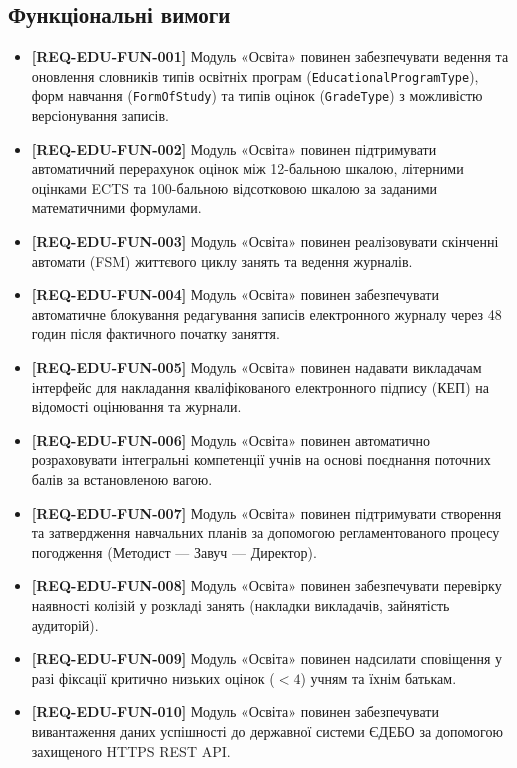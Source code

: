 \documentclass{article}
\begin{document}
\subsection{Функціональні вимоги}
\begin{itemize}
    \item \textbf{[REQ-EDU-FUN-001]} Модуль «Освіта» повинен забезпечувати ведення та оновлення словників типів освітніх програм (\texttt{EducationalProgramType}), форм навчання (\texttt{FormOfStudy}) та типів оцінок (\texttt{GradeType}) з можливістю версіонування записів.
    \item \textbf{[REQ-EDU-FUN-002]} Модуль «Освіта» повинен підтримувати автоматичний перерахунок оцінок між 12-бальною шкалою, літерними оцінками ECTS та 100-бальною відсотковою шкалою за заданими математичними формулами.
    \item \textbf{[REQ-EDU-FUN-003]} Модуль «Освіта» повинен реалізовувати скінченні автомати (FSM) життєвого циклу занять та ведення журналів.
    \item \textbf{[REQ-EDU-FUN-004]} Модуль «Освіта» повинен забезпечувати автоматичне блокування редагування записів електронного журналу через 48 годин після фактичного початку заняття.
    \item \textbf{[REQ-EDU-FUN-005]} Модуль «Освіта» повинен надавати викладачам інтерфейс для накладання кваліфікованого електронного підпису (КЕП) на відомості оцінювання та журнали.
    \item \textbf{[REQ-EDU-FUN-006]} Модуль «Освіта» повинен автоматично розраховувати інтегральні компетенції учнів на основі поєднання поточних балів за встановленою вагою.
    \item \textbf{[REQ-EDU-FUN-007]} Модуль «Освіта» повинен підтримувати створення та затвердження навчальних планів за допомогою регламентованого процесу погодження (Методист --- Завуч --- Директор).
    \item \textbf{[REQ-EDU-FUN-008]} Модуль «Освіта» повинен забезпечувати перевірку наявності колізій у розкладі занять (накладки викладачів, зайнятість аудиторій).
    \item \textbf{[REQ-EDU-FUN-009]} Модуль «Освіта» повинен надсилати сповіщення у разі фіксації критично низьких оцінок ($<4$) учням та їхнім батькам.
    \item \textbf{[REQ-EDU-FUN-010]} Модуль «Освіта» повинен забезпечувати вивантаження даних успішності до державної системи ЄДЕБО за допомогою захищеного HTTPS REST API.
\end{itemize}
\end{document}

